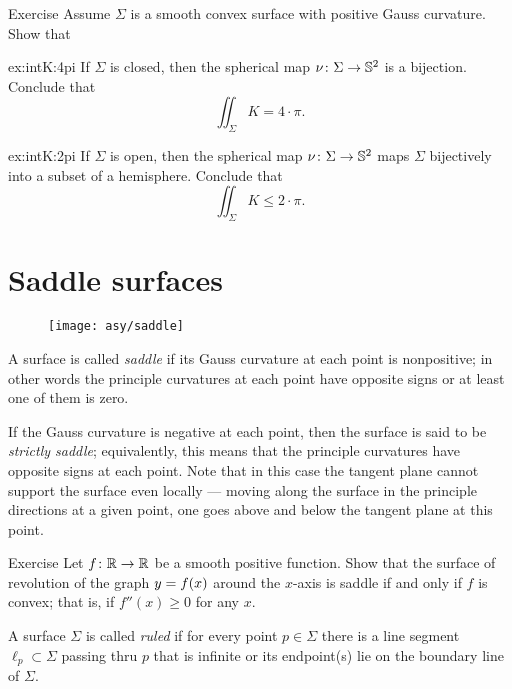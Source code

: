 \begin{thm}{Exercise}\label{ex:intK}
Assume $\Sigma$ is a smooth convex surface with positive Gauss curvature.
Show that 

\begin{subthm}{ex:intK:4pi}
If $\Sigma$ is closed, then the spherical map $\nu\colon\Sigma\to \mathbb{S}^2$ is a bijection. Conclude that 
\[\iint_\Sigma K=4\cdot\pi.\]
\end{subthm}
\begin{subthm}{ex:intK:2pi}
If $\Sigma$ is open, then  the spherical map $\nu\colon\Sigma\to \mathbb{S}^2$
maps $\Sigma$ bijectively into a subset of a hemisphere. Conclude that 
\[\iint_\Sigma K\le 2\cdot\pi.\]
\end{subthm}
\end{thm}



\section{Saddle surfaces}\label{sec:saddle}

\begin{wrapfigure}{r}{43 mm}
\vskip-8mm
\centering
\texttt{[image: asy/saddle]}
\vskip0mm
\end{wrapfigure}

A surface is called \emph{saddle} if its Gauss curvature at each point is nonpositive;
in other words the principle curvatures at each point have opposite signs or at least one of them is zero.

If the Gauss curvature is negative at each point,
then the surface is said to be \emph{strictly saddle};
equivalently, this means that the principle curvatures have opposite signs at each point.
Note that in this case the tangent plane cannot support the surface even locally --- moving along the surface in the principle directions at a given point, one goes above and below the tangent plane at this point.  


\begin{thm}{Exercise}\label{ex:convex-revolution}
Let $f\colon\mathbb{R}\to\mathbb{R}$ be a smooth positive function.
Show that the surface of revolution of the graph $y\z=f(x)$ around the $x$-axis
 is saddle if and only if $f$ is convex; that is, if $f''(x)\ge0$ for any $x$.
\end{thm}

A surface $\Sigma$ is called \emph{ruled} if for every point $p\in \Sigma$ there is a line segment $\ell_p\subset \Sigma$ passing thru $p$ that is infinite or its endpoint(s) lie on the boundary line of $\Sigma$.

